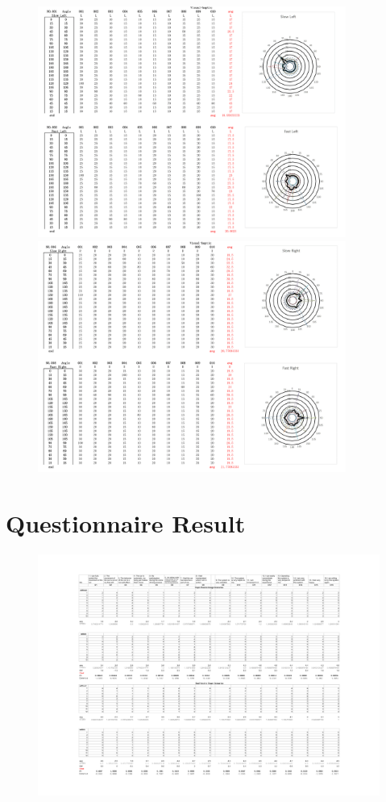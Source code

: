 \begin{figure}[h]
\centering
\includegraphics[width=0.9\textwidth,height=0.36\textheight]{A_thesis/appendix/Exp1_1-11.png}
\break
\break
\includegraphics[width=0.9\textwidth,height=0.36\textheight]{A_thesis/appendix/Exp1_1-12.png}
\end{figure}
\newpage

\section{Questionnaire Result}
\begin{figure}[h]
\centering
\includegraphics[width=1\textwidth,height=0.75\textheight]{A_thesis/appendix/Analysis2 3.xlsx - Exp23-1.png}
\end{figure}


